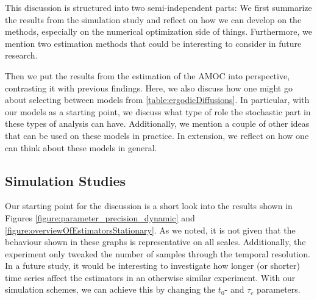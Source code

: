 This discussion is structured into two semi-independent parts: We first summarize the results from the simulation study and reflect on how we can develop on the methods, especially on the numerical optimization side of things. Furthermore, we mention two estimation methods that could be interesting to consider in future research.

Then we put the results from the estimation of the AMOC into perspective, contrasting it with previous findings. Here, we also discuss how one might go about selecting between models from \ref{table:ergodicDiffusions}. In particular, with our models as a starting point, we discuss what type of role the stochastic part in these types of analysis can have. Additionally, we mention a couple of other ideas that can be used on these models in practice. In extension, we reflect on how one can think about these models in general.
\subsection{Simulation Studies}
Our starting point for the discussion is a short look into the results shown in Figures \ref{figure:parameter_precision_dynamic} and \ref{figure:overviewOfEstimatorsStationary}. As we noted, it is not given that the behaviour shown in these graphs is representative on all scales. Additionally, the experiment only tweaked the number of samples through the temporal resolution. In a future study, it would be interesting to investigate how longer (or shorter) time series affect the estimators in an otherwise similar experiment. With our simulation schemes, we can achieve this by changing the $t_0$- and $\tau_c$ parameters.

